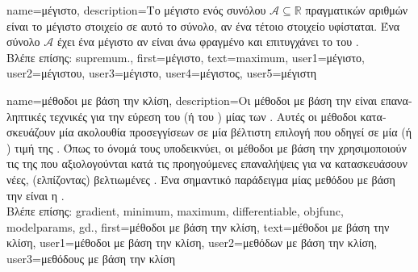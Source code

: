 {name={\foreignlanguage{greek}{μέγιστο}},
     description={\foreignlanguage{greek}{Το μέγιστο ενός συνόλου} 
		$\mathcal{A} \subseteq \mathbb{R}$ \foreignlanguage{greek}{πραγματικών αριθμών είναι το μέγιστο στοιχείο σε αυτό το σύνολο, 
		αν ένα τέτοιο στοιχείο υφίσταται. Ένα σύνολο $\mathcal{A}$ έχει ένα μέγιστο αν είναι άνω φραγμένο και 
		επιτυγχάνει το}  \foreignlanguage{greek}{του} \cite[Sec.~1.4]{RudinBookPrinciplesMatheAnalysis}.\\
		\foreignlanguage{greek}{Βλέπε επίσης:} \gls{supremum}.},
 	first={\foreignlanguage{greek}{μέγιστο}},
 	text={maximum},
 	user1={\foreignlanguage{greek}{μέγιστο}}, %
 	user2={\foreignlanguage{greek}{μέγιστου}}, %
 	user3={\foreignlanguage{greek}{μέγιστο}}, %
 	user4={\foreignlanguage{greek}{μέγιστος}}, %
 	user5={\foreignlanguage{greek}{μέγιστη}} %
}

{name={\foreignlanguage{greek}{μέθοδοι με βάση την κλίση}}, 
	description={\foreignlanguage{greek}{Οι μέθοδοι με βάση την}  
		\foreignlanguage{greek}{είναι επαναληπτικές τεχνικές για την εύρεση του}  (\foreignlanguage{greek}{ή του} ) 
		\foreignlanguage{greek}{μίας}   \foreignlanguage{greek}{των} . 
		\foreignlanguage{greek}{Αυτές οι μέθοδοι κατασκευάζουν μία ακολουθία προσεγγίσεων σε μία βέλτιστη επιλογή} 
		 \foreignlanguage{greek}{που οδηγεί σε μία}  (\foreignlanguage{greek}{ή} ) 
		\foreignlanguage{greek}{τιμή της} . \foreignlanguage{greek}{Όπως το όνομά τους υποδεικνύει,}
		\foreignlanguage{greek}{οι μέθοδοι με βάση την}  \foreignlanguage{greek}{χρησιμοποιούν τις}  
		\foreignlanguage{greek}{της}  \foreignlanguage{greek}{που αξιολογούνται κατά τις προηγούμενες επαναλήψεις για να
		κατασκευάσουν νέες, (ελπίζοντας) βελτιωμένες} . \foreignlanguage{greek}{Ένα σημαντικό παράδειγμα μίας 
		μεθόδου με βάση την}  \foreignlanguage{greek}{είναι η} .\\
		\foreignlanguage{greek}{Βλέπε επίσης:} \gls{gradient}, \gls{minimum}, \gls{maximum}, \gls{differentiable}, \gls{objfunc}, \gls{modelparams}, \gls{gd}.},
	first={\foreignlanguage{greek}{μέθοδοι με βάση την κλίση}},
	text={\foreignlanguage{greek}{μέθοδοι με βάση την κλίση}},
	user1={\foreignlanguage{greek}{μέθοδοι με βάση την κλίση}}, %
	user2={\foreignlanguage{greek}{μεθόδων με βάση την κλίση}}, %
	user3={\foreignlanguage{greek}{μεθόδους με βάση την κλίση}} %
}

